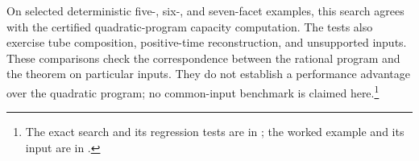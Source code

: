 On selected deterministic five-, six-, and seven-facet examples, this search
agrees with the certified quadratic-program capacity computation.  The tests
also exercise tube composition, positive-time reconstruction, and unsupported
inputs.  These comparisons check the correspondence between the rational
program and the theorem on particular inputs.  They do not establish a
performance advantage over the quadratic program; no common-input benchmark
is claimed here.\footnote{The exact search and its regression tests are in
;
the worked example and its input are in
.}
